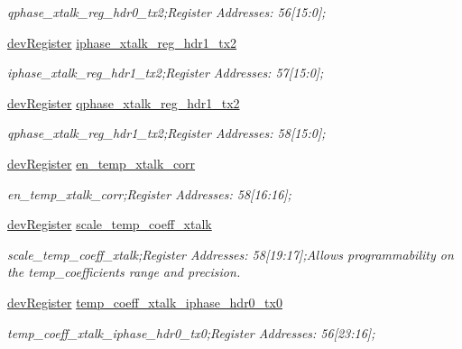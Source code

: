 \begin{DoxyCompactItemize}
\begin{DoxyCompactList}\small\item\em qphase\+\_\+xtalk\+\_\+reg\+\_\+hdr0\+\_\+tx2;Register Addresses\+: 56\mbox{[}15\+:0\mbox{]}; \end{DoxyCompactList}\item 
\mbox{\hyperlink{classdev_register}{dev\+Register}} \mbox{\hyperlink{class_o_p_t3101_registers_af3fed602f69fc020eee20ff7995af352}{iphase\+\_\+xtalk\+\_\+reg\+\_\+hdr1\+\_\+tx2}}
\begin{DoxyCompactList}\small\item\em iphase\+\_\+xtalk\+\_\+reg\+\_\+hdr1\+\_\+tx2;Register Addresses\+: 57\mbox{[}15\+:0\mbox{]}; \end{DoxyCompactList}\item 
\mbox{\hyperlink{classdev_register}{dev\+Register}} \mbox{\hyperlink{class_o_p_t3101_registers_a77d16569f490a88ff905d95d88f65a63}{qphase\+\_\+xtalk\+\_\+reg\+\_\+hdr1\+\_\+tx2}}
\begin{DoxyCompactList}\small\item\em qphase\+\_\+xtalk\+\_\+reg\+\_\+hdr1\+\_\+tx2;Register Addresses\+: 58\mbox{[}15\+:0\mbox{]}; \end{DoxyCompactList}\item 
\mbox{\hyperlink{classdev_register}{dev\+Register}} \mbox{\hyperlink{class_o_p_t3101_registers_a766563158d5d77e4c14d4cff7172751b}{en\+\_\+temp\+\_\+xtalk\+\_\+corr}}
\begin{DoxyCompactList}\small\item\em en\+\_\+temp\+\_\+xtalk\+\_\+corr;Register Addresses\+: 58\mbox{[}16\+:16\mbox{]}; \end{DoxyCompactList}\item 
\mbox{\hyperlink{classdev_register}{dev\+Register}} \mbox{\hyperlink{class_o_p_t3101_registers_a512cf2ca50b1fa7120df25bde9ac8ffe}{scale\+\_\+temp\+\_\+coeff\+\_\+xtalk}}
\begin{DoxyCompactList}\small\item\em scale\+\_\+temp\+\_\+coeff\+\_\+xtalk;Register Addresses\+: 58\mbox{[}19\+:17\mbox{]};Allows programmability on the temp\+\_\+coefficients range and precision. \end{DoxyCompactList}\item 
\mbox{\hyperlink{classdev_register}{dev\+Register}} \mbox{\hyperlink{class_o_p_t3101_registers_a049562de3542626eb026593553acbc84}{temp\+\_\+coeff\+\_\+xtalk\+\_\+iphase\+\_\+hdr0\+\_\+tx0}}
\begin{DoxyCompactList}\small\item\em temp\+\_\+coeff\+\_\+xtalk\+\_\+iphase\+\_\+hdr0\+\_\+tx0;Register Addresses\+: 56\mbox{[}23\+:16\mbox{]}; \end{DoxyCompactList}\item 

\end{DoxyCompactItemize}
